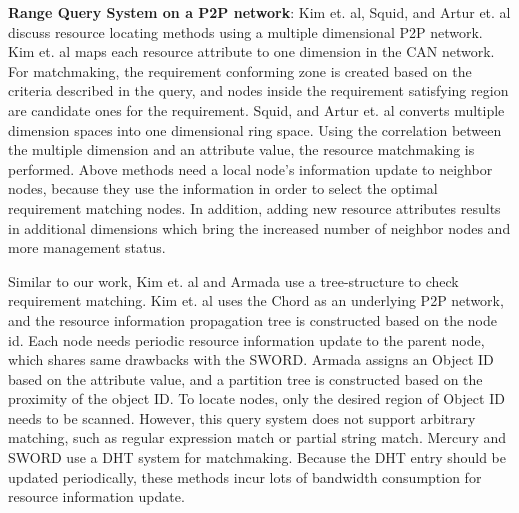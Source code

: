 \documentclass{acm_proc_article-sp}
\begin{document}
\textbf{Range Query System on a P2P network}: Kim et. al\cite{can_query}, Squid\cite{squid}, and Artur et. al\cite{query_for_grid} discuss resource locating methods using a multiple dimensional P2P network. 
Kim et. al\cite{can_query} maps each resource attribute to one dimension in the CAN network. For matchmaking, the requirement conforming zone is created based on the criteria described in the query, 
and nodes inside the requirement satisfying region are candidate ones for the requirement.
Squid\cite{squid}, and Artur et. al\cite{query_for_grid} converts multiple dimension spaces into one dimensional ring space. Using the correlation between the multiple dimension and an attribute value, 
the resource matchmaking is performed. 
Above methods need a local node's information update to neighbor nodes, because they use the information in order to select the optimal requirement matching nodes.  
In addition, adding new resource attributes results in additional dimensions which bring the increased number of neighbor nodes and more management status.

Similar to our work, Kim et. al\cite{chord_matching} and Armada\cite{armada} use a tree-structure to check requirement matching. 
Kim et. al\cite{chord_matching} uses the Chord as an underlying P2P network, and the resource information propagation tree is
constructed based on the node id. Each node needs periodic resource information update to the parent node, which shares same drawbacks with the SWORD.
Armada\cite{armada} assigns an Object ID based on the attribute value, and a partition tree is constructed based on the proximity of the object ID. 
To locate nodes, only the desired region of Object ID needs to be scanned. However, this query system does not support arbitrary matching, such as regular expression match or partial string match.
Mercury\cite{mercury} and SWORD\cite{sword} use a DHT system for matchmaking. 
Because the DHT entry should be updated periodically, these methods incur lots of bandwidth consumption for resource information update.
\end{document}

